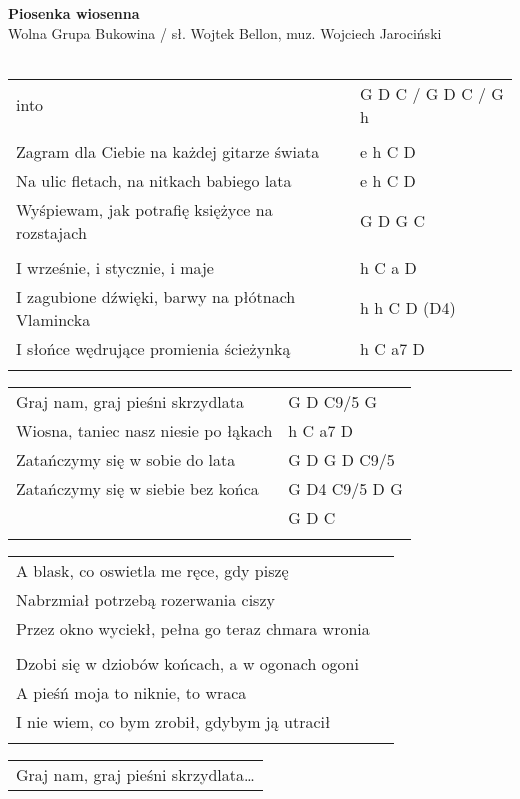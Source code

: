 \documentclass[a5paper]{article}
\begin{document}


\noindent
\fontsize{12pt}{15pt}\selectfont
\textbf{Piosenka wiosenna} \\
\fontsize{8pt}{10pt}\selectfont
Wolna Grupa Bukowina / sł. Wojtek Bellon, muz. Wojciech Jarociński \\ \\
\fontsize{10pt}{12pt}\selectfont
{}
\begin{tabular}{@{}p{8.50cm}p{3cm}@{}}
\noindent
into & G D C / G D C / G h \\ \\
Zagram dla Ciebie na każdej gitarze świata & e h C D \\
Na ulic fletach, na nitkach babiego lata & e h C D \\
Wyśpiewam, jak potrafię księżyce na rozstajach & G D G C \\ \\
I wrześnie, i stycznie, i maje & h C a D \\
I zagubione dźwięki, barwy na płótnach Vlamincka & h h C D (D4)\\
I słońce wędrujące promienia ścieżynką & h C a7 D \\ \\
\end{tabular}

\noindent
\begin{tabular}{@{}p{7.50cm}p{3cm}@{}}
Graj nam, graj pieśni skrzydlata & G D C9/5 G \\
Wiosna, taniec nasz niesie po łąkach & h C a7 D \\
Zatańczymy się w sobie do lata & G D G D C9/5 \\
Zatańczymy się w siebie bez końca & G D4 C9/5 D G \\
& G D C \\ \\
\end{tabular}

\noindent
\begin{tabular}{@{}p{8.50cm}p{3cm}@{}}
A blask, co oswietla me ręce, gdy piszę \\
Nabrzmiał potrzebą rozerwania ciszy \\
Przez okno wyciekł, pełna go teraz chmara wronia \\ \\
Dzobi się w dziobów końcach, a w ogonach ogoni \\ 
A pieśń moja to niknie, to wraca \\
I nie wiem, co bym zrobił, gdybym ją utracił \\ \\
\end{tabular}

\noindent
\begin{tabular}{@{}p{8.00cm}@{}}
Graj nam, graj pieśni skrzydlata…
\end{tabular}
\end{document}
